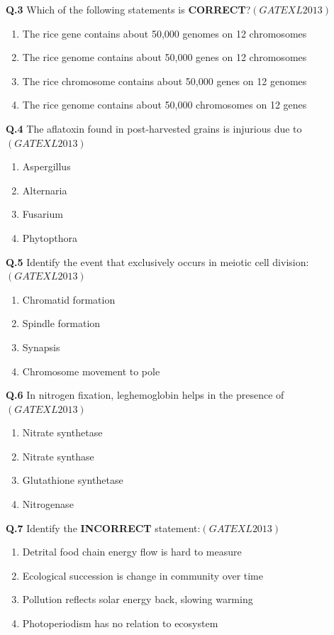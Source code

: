 \documentclass[12pt]{article}
\theoremstyle{remark}
\providecommand{\brak}[1]{\ensuremath{\left(#1\right)}}
\begin{document}
\textbf{Q.3} Which of the following statements is \textbf{CORRECT}?\hfill  \textit{\brak{GATE XL 2013}}
\begin{enumerate}
    \item The rice gene contains about 50,000 genomes on 12 chromosomes
    \item The rice genome contains about 50,000 genes on 12 chromosomes
    \item The rice chromosome contains about 50,000 genes on 12 genomes
    \item The rice genome contains about 50,000 chromosomes on 12 genes
\end{enumerate}

\textbf{Q.4} The aflatoxin found in post-harvested grains is injurious due to\hfill  \textit{\brak{GATE XL 2013}}
\begin{enumerate}
    \item Aspergillus
    \item Alternaria
    \item Fusarium
    \item Phytopthora
\end{enumerate}

\textbf{Q.5} Identify the event that exclusively occurs in meiotic cell division:\hfill  \textit{\brak{GATE XL 2013}}
\begin{enumerate}
    \item Chromatid formation
    \item Spindle formation
    \item Synapsis
    \item Chromosome movement to pole
\end{enumerate}

\textbf{Q.6} In nitrogen fixation, leghemoglobin helps in the presence of\hfill  \textit{\brak{GATE XL 2013}}
\begin{enumerate}
    \item Nitrate synthetase
    \item Nitrate synthase
    \item Glutathione synthetase
    \item Nitrogenase
\end{enumerate}

\textbf{Q.7} Identify the \textbf{INCORRECT} statement:\hfill  \textit{\brak{GATE XL 2013}}
\begin{enumerate}
    \item Detrital food chain energy flow is hard to measure
    \item Ecological succession is change in community over time
    \item Pollution reflects solar energy back, slowing warming
    \item Photoperiodism has no relation to ecosystem
\end{enumerate}
\end{document}
